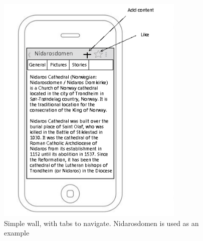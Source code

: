 \documentclass[11pt]{book}
\begin{document}
\begin{figure}[H]
    \centering
    \includegraphics[width=0.8\textwidth]{Figures/Phases/Sprint1/versiononeSimpleWall.png}
    \caption{Simple wall, with tabs to navigate. Nidarosdomen is used as an example}
    \label{fig:phases_sprint1_uiVersionOneSimpleWall}
\end{figure}
\end{document}
